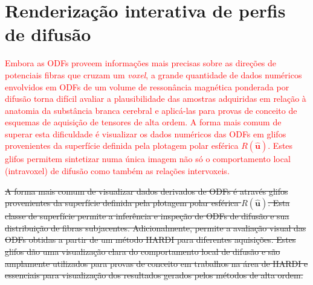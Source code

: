 \chapter{Renderização interativa de perfis de difusão}
\label{chap::renderizacao_interativa_de_perfis_de_difusao}



\textcolor{red}{Embora as ODFs proveem informações mais precisas sobre as direções de potenciais fibras que cruzam um \textit{voxel}, a grande quantidade de dados numéricos envolvidos em ODFs de um volume de ressonância magnética ponderada por difusão torna difícil avaliar a plausibilidade das amostras adquiridas em relação à anatomia da substância branca cerebral e aplicá-las para provas de conceito de esquemas de aquisição de tensores de alta ordem. A forma mais comum de superar esta dificuldade é visualizar os dados numéricos das ODFs em glifos provenientes da superfície definida pela plotagem polar esférica $R(\mathbf{\hat{u}})$. Estes glifos permitem sintetizar numa única imagem não só o comportamento local (intravoxel) de difusão como também as relações intervoxeis.} 

\sout{A forma mais comum de visualizar dados derivados de ODFs é através glifos provenientes da superfície definida pela plotagem polar esférica $R(\mathbf{\hat{u}})$. Esta classe de superfície permite a inferência e inspeção de ODFs de difusão e sua distribuição de fibras subjacentes. Adicionalmente, permite a avaliação visual das ODFs obtidas a partir de um método HARDI para diferentes aquisições. Estes glifos dão uma visualização clara do comportamento local de difusão e são amplamente utilizados para provas de conceito em trabalhos na área de HARDI e essenciais para visualização dos resultados gerados pelos métodos de alta ordem.}

